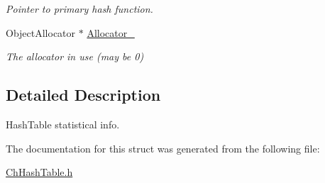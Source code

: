 \begin{DoxyCompactItemize}
\begin{DoxyCompactList}\small\item\em Pointer to primary hash function. \end{DoxyCompactList}\item 
\hypertarget{structHTStats_addff314f56507d4cb7e1e0775daf62f8}{Object\-Allocator $\ast$ \hyperlink{structHTStats_addff314f56507d4cb7e1e0775daf62f8}{Allocator\-\_\-}}\label{structHTStats_addff314f56507d4cb7e1e0775daf62f8}

\begin{DoxyCompactList}\small\item\em The allocator in use (may be 0) \end{DoxyCompactList}\end{DoxyCompactItemize}


\subsection{Detailed Description}
Hash\-Table statistical info. 

The documentation for this struct was generated from the following file\-:\begin{DoxyCompactItemize}
\item 
\hyperlink{ChHashTable_8h}{Ch\-Hash\-Table.\-h}\end{DoxyCompactItemize}
